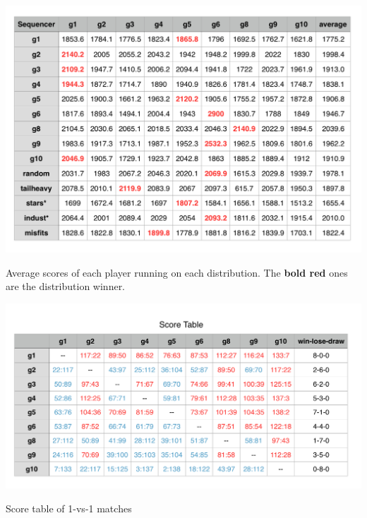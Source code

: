 \begin{table}[ht]
\includegraphics[width=0.9\linewidth]{avgtable.png}
\caption{Average scores of each player running on each distribution. \newline
The {\bf \color{red} bold red} ones are the distribution winner.}\label{fig:table}
\end{table}

\begin{table}[ht]
\centering
\includegraphics[width=0.9\linewidth]{scoretablefinal.png}
\caption{Score table of 1-vs-1 matches}\label{fig:scoretable}
\end{table}

